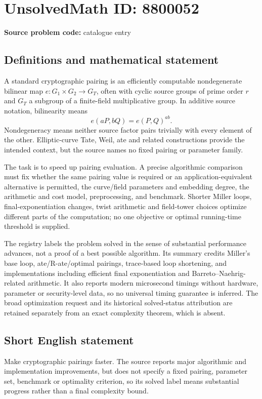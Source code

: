 \documentclass[11pt]{article}
\begin{document}
\section*{UnsolvedMath ID: 8800052}
\textbf{Source problem code:} catalogue entry
\subsection{Definitions and mathematical statement}
A standard cryptographic pairing is an efficiently computable nondegenerate bilinear map \(e:G_1\times G_2\to G_T\), often with cyclic source groups of prime order \(r\) and \(G_T\) a subgroup of a finite-field multiplicative group. In additive source notation, bilinearity means
\[
 e(aP,bQ)=e(P,Q)^{ab}.
\]
Nondegeneracy means neither source factor pairs trivially with every element of the other. Elliptic-curve Tate, Weil, ate and related constructions provide the intended context, but the source names no fixed pairing or parameter family.

The task is to speed up pairing evaluation. A precise algorithmic comparison must fix whether the same pairing value is required or an application-equivalent alternative is permitted, the curve/field parameters and embedding degree, the arithmetic and cost model, preprocessing, and benchmark. Shorter Miller loops, final-exponentiation changes, twist arithmetic and field-tower choices optimize different parts of the computation; no one objective or optimal running-time threshold is supplied.

The registry labels the problem solved in the sense of substantial performance advances, not a proof of a best possible algorithm. Its summary credits Miller's base loop, ate/R-ate/optimal pairings, trace-based loop shortening, and implementations including efficient final exponentiation and Barreto--Naehrig-related arithmetic. It also reports modern microsecond timings without hardware, parameter or security-level data, so no universal timing guarantee is inferred. The broad optimization request and its historical solved-status attribution are retained separately from an exact complexity theorem, which is absent.
\subsection{Short English statement}
Make cryptographic pairings faster. The source reports major algorithmic and implementation improvements, but does not specify a fixed pairing, parameter set, benchmark or optimality criterion, so its solved label means substantial progress rather than a final complexity bound.
\end{document}
